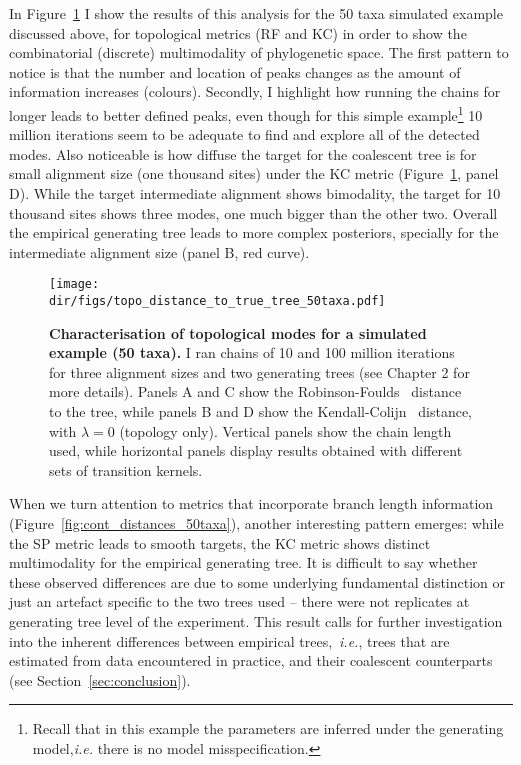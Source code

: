 In Figure~\ref{fig:topo_distances_50taxa} I show the results of this analysis for the 50 taxa simulated example discussed above, for topological metrics (RF and KC)  in order to show the combinatorial (discrete) multimodality of phylogenetic space.
The first pattern to notice is that the number and location of peaks changes as the amount of information increases (colours).
Secondly, I highlight how running the chains for longer leads to better defined peaks, even though for this simple example\footnote{Recall that in this example the parameters are inferred under the generating model,\textit{i.e.} there is no model misspecification.} 10 million iterations seem to be adequate to find and explore all of the detected modes.
Also noticeable is how diffuse the target for the coalescent tree is for small alignment size (one thousand sites) under the KC metric (Figure~\ref{fig:topo_distances_50taxa}, panel D).
While the target intermediate alignment shows bimodality, the target for 10 thousand sites shows three modes, one much bigger than the other two.
Overall the empirical generating tree leads to more complex posteriors, specially for the intermediate alignment size (panel B, red curve).

\begin{figure}[!ht]
\begin{center}
\texttt{[image: \\dir/figs/topo\_distance\_to\_true\_tree\_50taxa.pdf]} 
\end{center}
 \caption[Characterisation of topological modes for a simulated example (50 taxa).]{\textbf{Characterisation of topological modes for a simulated example (50 taxa).}
  I ran chains of 10 and 100 million iterations for three alignment sizes and two generating trees (see Chapter 2 for more details).
 Panels A and C show the Robinson-Foulds~\citep{Robinson1981} distance to the tree, while panels B and D show the Kendall-Colijn~\citep{Kendall2016} distance, with $\lambda =0$ (topology only). 
 Vertical panels show the chain length used, while horizontal panels display results obtained with different sets of transition kernels.
 }
 \label{fig:topo_distances_50taxa}
\end{figure}

When we turn attention to metrics that incorporate branch length information (Figure~\ref{fig:cont_distances_50taxa}), another interesting pattern emerges: while the SP metric leads to smooth targets, the KC metric shows distinct multimodality for the empirical generating tree.
It is difficult to say whether these observed differences are due to some underlying fundamental distinction or just an artefact specific to the two trees used -- there were not replicates at generating tree level of the experiment.
This result calls for further investigation into the inherent differences between empirical trees,~\textit{i.e.}, trees that are estimated from data encountered in practice, and their coalescent counterparts (see Section~\ref{sec:conclusion}).

